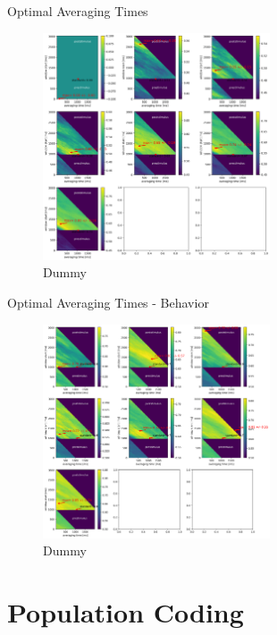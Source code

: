 \documentclass[10pt]{beamer}
\begin{document}
\begin{frame}[fragile]{Optimal Averaging Times}
\begin{center}
	\begin{figure}
	\caption*{Dummy}
      \includegraphics[width=0.6\textwidth]{placeholder_wind_pres.png}
	\end{figure}
	\end{center}
\end{frame}

\begin{frame}[fragile]{Optimal Averaging Times - Behavior}
\begin{center}
	\begin{figure}
	\caption*{Dummy}
      \includegraphics[width=0.6\textwidth]{placeholder_wind_hit.png}
	\end{figure}
	\end{center}
\end{frame}

\section{Population Coding}
\end{document}
